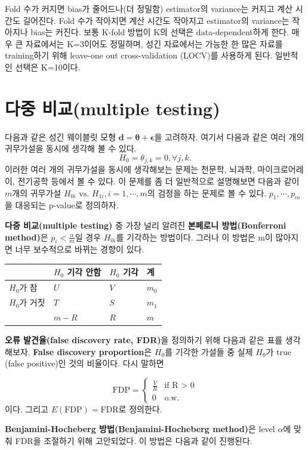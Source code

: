 \documentclass[b5paper,]{book}
\theoremstyle{definition}
\theoremstyle{definition}
\theoremstyle{definition}
\theoremstyle{remark}
\begin{document}
Fold 수가 커지면 bias가 줄어드나(더 정밀함) estimator의 variance는
커지고 계산 시간도 길어진다. Fold 수가 작아지면 계산 시간도 작아지고
estimator의 variance는 작아지나 bias는 커진다. 보통 K-fold 방법이 K의
선택은 data-dependent하게 한다. 매우 큰 자료에서는 K=3이어도 정밀하며,
성긴 자료에서는 가능한 한 많은 자료를 training하기 위해 leave-one out
cross-validation (LOCV)를 사용하게 된다. 일반적인 선택은 K=10이다.

\section{다중 비교(multiple testing)}\label{-multiple-testing}

다음과 같은 성긴 웨이블릿 모형
\(\mathbf{d}=\mathbf{\theta}+\mathbf{\epsilon}\)을 고려하자. 여기서
다음과 같은 여러 개의 귀무가설을 동시에 생각해 볼 수 있다.
\[H_{0}=\theta_{j,k}=0, \forall j,k.\] 이러한 여러 개의 귀무가설을
동시에 생각해보는 문제는 천문학, 뇌과학, 마이크로어레이, 전기공학 등에서
볼 수 있다. 이 문제를 좀 더 일반적으로 설명해보면 다음과 같이 \(m\)개의
귀무가설 \(H_{0i} \text{ vs. } H_{1i}, i=1,\cdots ,m\)의 검정을 하는
문제로 볼 수 있다. \(p_{1},\cdots , p_{m}\)을 대응되는 p-value로
정의하자.

\textbf{다중 비교(multiple testing)} 중 가장 널리 알려진
\textbf{본페로니 방법(Bonferroni method)}은
\(p_{i} < \frac{\alpha}{m}\)일 경우 \(H_{0i}\)를 기각하는 방법이다.
그러나 이 방법은 m이 많아지면 너무 보수적으로 바뀌는 경향이 있다.

\begin{longtable}[]{@{}llll@{}}
\toprule
& \(H_{0}\) 기각 안함 & \(H_{0}\) 기각 & 계\tabularnewline
\midrule
\endhead
\(H_{0}\)가 참 & \(U\) & \(V\) & \(m_{0}\)\tabularnewline
\(H_{0}\)가 거짓 & \(T\) & \(S\) & \(m_{1}\)\tabularnewline
& \(m-R\) & \(R\) & \(m\)\tabularnewline
\bottomrule
\end{longtable}

\textbf{오류 발견율(false discovery rate, FDR)}을 정의하기 위해 다음과
같은 표를 생각해보자. \textbf{False discovery proportion}은 \(H_{0}\)를
기각한 가설들 중 실제 \(H_{0}\)가 true (false positive)인 것의 비율이다.
다시 말하면

\[
\text{FDP}=
\begin{cases}
\frac{V}{R} & \text{if R $>$ 0}\\
0 & \text{o.w.}
\end{cases}
\] 이다. 그리고 \(E(\text{FDP})=\)FDR로 정의한다.

\textbf{Benjamini-Hocheberg 방법(Benjamini-Hocheberg method)}은 level
\(\alpha\)에 맞춰 FDR을 조절하기 위해 고안되었다. 이 방법은 다음과 같이
진행된다.
\end{document}
